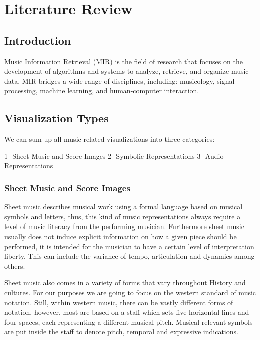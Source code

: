 \chapter{Literature Review} \label{chap:sota}
\section{Introduction}

Music Information Retrieval (MIR) is the field of research that focuses on the
development of algorithms and systems to analyze, retrieve, and organize music data.
MIR bridges a wide range of disciplines, including: 
musicology, signal processing, machine learning, and human-computer interaction. 

\cite{mullerFundamentalsMusicProcessing2015}

\section{Visualization Types}\label{sec:dialecto}

We can sum up all music related visualizations into three categories:

    1- Sheet Music and Score Images
    2- Symbolic Representations
    3- Audio Representations

\subsection{Sheet Music and Score Images}

Sheet music describes musical work using a formal language based on musical symbols and letters, thus, this kind of music representations always require  a level of music literacy from the performing musician. Furthermore sheet music usually does not induce explicit information on how a given piece should be performed, it is intended for the musician to have a certain level of interpretation liberty. This can include the variance of tempo, articulation and dynamics among others.

Sheet music also comes in a variety of forms that vary throughout History and cultures. For our purposes we are going to focus on the western standard of music notation. Still, within western music, there can be vastly different forms of notation, however, most are based on a staff which sets five horizontal lines and four spaces, each representing a different musical pitch. Musical relevant symbols are put inside the staff to denote pitch, temporal and expressive indications. \cite{mullerMusicRepresentations2015a}

